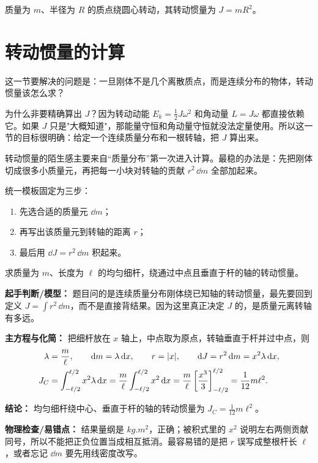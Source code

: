 \documentclass[lang=cn,11pt]{elegantbook}
\newcommand{\bridge}[1]{\begin{note}#1\end{note}}
\begin{document}
\begin{example}
质量为 \(m\)、半径为 \(R\) 的质点绕圆心转动，其转动惯量为 \(J=mR^2\)。
\end{example}

\section{转动惯量的计算}

这一节要解决的问题是：一旦刚体不是几个离散质点，而是连续分布的物体，转动惯量该怎么求？

\bridge{为什么非要精确算出 \(J\)？因为转动动能 \(E_k=\frac12 J\omega^2\) 和角动量 \(L=J\omega\) 都直接依赖它。如果 \(J\) 只是"大概知道"，那能量守恒和角动量守恒就没法定量使用。所以这一节的目标很明确：给定一个连续质量分布和一根转轴，把 \(J\) 算出来。}

\bridge{转动惯量的陌生感主要来自“质量分布”第一次进入计算。最稳的办法是：先把刚体切成很多小质量元，再把每一小块对转轴的贡献 \(r^2\,\dd m\) 全部加起来。}

统一模板固定为三步：
\begin{enumerate}
  \item 先选合适的质量元 \(\dd m\)；
  \item 再写出该质量元到转轴的距离 \(r\)；
  \item 最后用 \(\dd J=r^2\,\dd m\) 积起来。
\end{enumerate}

\begin{example}[均匀细杆绕中心的转动惯量]
求质量为 \(m\)、长度为 \(\ell\) 的均匀细杆，绕通过中点且垂直于杆的轴的转动惯量。
\end{example}

\begin{solution}
\textbf{起手判断/模型：} 题目问的是连续质量分布刚体绕已知轴的转动惯量，最先要回到定义
\(J=\int r^2\,\dd m\)，而不是直接背结果。因为这里真正决定 \(J\) 的，是质量元离转轴有多远。

\textbf{主方程与化简：} 把细杆放在 \(x\) 轴上，中点取为原点，转轴垂直于杆并过中点，则
\[
\begin{aligned}
\lambda&=\frac{m}{\ell},\qquad \dd m=\lambda\,\dd x,\qquad r=\abs{x},\qquad
\dd J=r^2\,\dd m=x^2\lambda\,\dd x,\\
J_C&=\int_{-\ell/2}^{\ell/2}x^2\lambda\,\dd x
=\frac{m}{\ell}\int_{-\ell/2}^{\ell/2}x^2\,\dd x
=\frac{m}{\ell}\left[\frac{x^3}{3}\right]_{-\ell/2}^{\ell/2}
=\frac{1}{12}m\ell^2.
\end{aligned}
\]

\textbf{结论：} 均匀细杆绕中心、垂直于杆的轴的转动惯量为 \(J_C=\frac{1}{12}m\ell^2\)。

\textbf{物理检查/易错点：} 结果量纲是 \(\si{kg.m^2}\)，正确；被积式里的 \(x^2\) 说明左右两侧贡献同号，所以不能把正负位置当成相互抵消。最容易错的是把 \(r\) 误写成整根杆长 \(\ell\)，或者忘记 \(\dd m\) 要先用线密度改写。
\end{solution}
\end{document}
